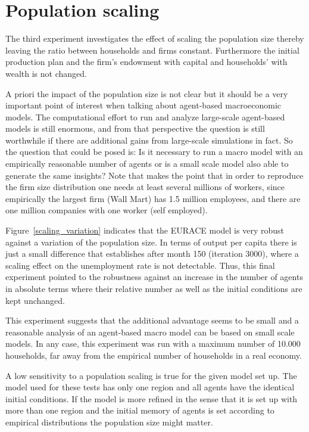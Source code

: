 \section{Population scaling}

The third experiment investigates the effect of scaling the population size thereby leaving the ratio between households and firms constant. Furthermore the initial production plan and the firm's endowment with capital and households' with wealth is not changed. 

A priori the impact of the population size is not clear but it should be a very important point of interest when talking about agent-based macroeconomic models. The computational effort to run and analyze large-scale agent-based models is still enormous, and from that perspective the question is still worthwhile if there are additional gains from large-scale simulations in fact. So the question that could be posed is: Is it necessary to run a macro model with an empirically reasonable number of agents or is a small scale model also able to generate the same insights? Note that \cite{Axtell_2000} makes the point that in order to reproduce the firm size distribution one needs at least several millions of workers, since empirically the largest firm (Wall Mart) has 1.5 million employees, and there are one million companies with one worker (self employed).     

Figure~\ref{scaling_variation} indicates that the EURACE model is very robust against a variation of the population size. In terms of output per capita there is just a small difference that establishes after month 150 (iteration 3000), where a scaling effect on the unemployment rate is not detectable. Thus, this final experiment pointed to the robustness against an increase in the number of agents in absolute terms where their relative number as well as the initial conditions are kept unchanged. 

This experiment suggests that the additional advantage seems to be small and a reasonable analysis of an agent-based macro model can be based on small scale models. In any case, this experiment was run with a maximum number of 10.000 households, far away from the empirical number of households in a real economy. 

A low sensitivity to a population scaling is true for the given model set up. The model used for these tests has only one region and all agents have the identical initial conditions. If the model is more refined in the sense that it is set up with more than one region and the initial memory of agents is set according to empirical distributions the population size might matter.  

